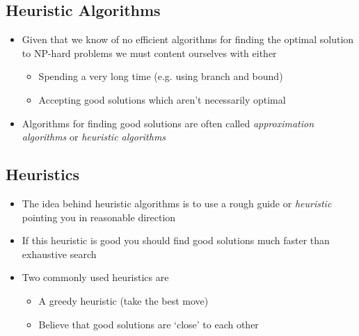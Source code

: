 \begin{slide}
\section{Heuristic Algorithms}

\begin{PauseHighLight}
  \begin{itemize}
  \item Given that we know of no efficient algorithms for finding the
    optimal solution to NP-hard problems we must content ourselves with
    either\pause
    \begin{itemize}
    \item Spending a very long time (e.g. using branch and bound)\pause
    \item Accepting good solutions which aren't necessarily optimal\pause
    \end{itemize}
  \item Algorithms for finding good solutions are often called
  \emph{approximation algorithms} or \emph{heuristic algorithms}\pause
  \end{itemize}
\end{PauseHighLight}

\end{slide}


\begin{slide}
\section{Heuristics}

\begin{PauseHighLight}
  \begin{itemize}
  \item The idea behind heuristic algorithms is to use a rough guide or
    \emph{heuristic} pointing you in reasonable direction\pause
  \item If this heuristic is good you should find good solutions much
    faster than exhaustive search\pause
  \item Two commonly used heuristics are
    \begin{itemize}
    \item A greedy heuristic (take the best move)\pause
    \item Believe that good solutions are `close' to each other\pause
    \end{itemize}
  \end{itemize}
\end{PauseHighLight}

\end{slide}

